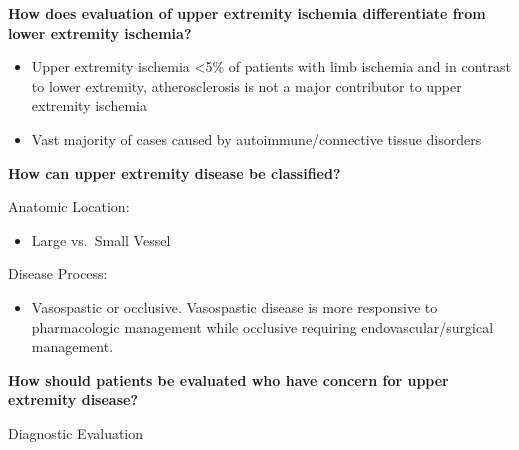 \documentclass[
]{book}
\providecommand{\tightlist}{%
  \setlength{\itemsep}{0pt}\setlength{\parskip}{0pt}}
\begin{document}
\textbf{How does evaluation of upper extremity ischemia differentiate from
lower extremity ischemia?} \citep{shuja117UpperExtremity}

\begin{itemize}
\item
  Upper extremity ischemia \textless5\% of patients with limb ischemia and in
  contrast to lower extremity, atherosclerosis is not a major
  contributor to upper extremity ischemia
\item
  Vast majority of cases caused by autoimmune/connective tissue
  disorders
\end{itemize}

\textbf{How can upper extremity disease be classified?}

Anatomic Location:

\begin{itemize}
\tightlist
\item
  Large vs.~Small Vessel
\end{itemize}

Disease Process:

\begin{itemize}
\tightlist
\item
  Vasospastic or occlusive. Vasospastic disease is more responsive to
  pharmacologic management while occlusive requiring
  endovascular/surgical management.
\end{itemize}

\textbf{How should patients be evaluated who have concern for upper extremity
disease?}

Diagnostic Evaluation
\end{document}
